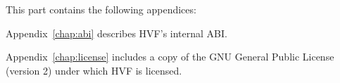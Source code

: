 \cbstart
This part contains the following appendices:

Appendix~\ref{chap:abi} describes HVF's internal ABI.

Appendix~\ref{chap:license} includes a copy of the GNU General Public
License (version 2) under which HVF is licensed.
\cbend



